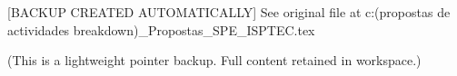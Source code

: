 [BACKUP CREATED AUTOMATICALLY] See original file at c:\Users\PCGAME\Desktop\SPE(propostas de actividades breakdown)\Relatorio_Propostas_SPE_ISPTEC.tex

(This is a lightweight pointer backup. Full content retained in workspace.)